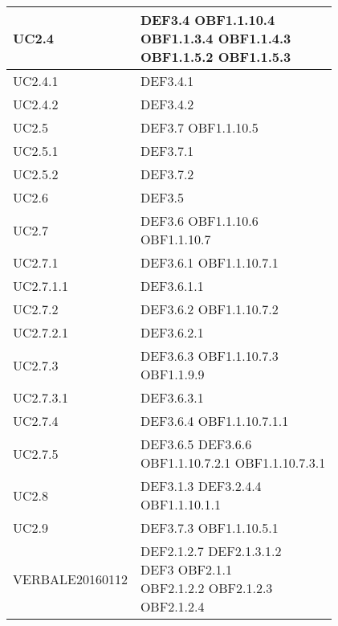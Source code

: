 \documentclass{scalatekids-article}
\begin{document}
\begin{longtable}[H]{|p{5.5cm}|p{5.5cm}|}
\hline
UC2.4 & \multiLineCell[t]{DEF3.4 OBF1.1.10.4\\OBF1.1.3.4 OBF1.1.4.3\\OBF1.1.5.2 OBF1.1.5.3\\}\\
\hline
UC2.4.1 & \multiLineCell[t]{DEF3.4.1\\}\\
\hline
UC2.4.2 & \multiLineCell[t]{DEF3.4.2\\}\\
\hline
UC2.5 & \multiLineCell[t]{DEF3.7 OBF1.1.10.5\\}\\
\hline
UC2.5.1 & \multiLineCell[t]{DEF3.7.1\\}\\
\hline
UC2.5.2 & \multiLineCell[t]{DEF3.7.2\\}\\
\hline
UC2.6 & \multiLineCell[t]{DEF3.5\\}\\
\hline
UC2.7 & \multiLineCell[t]{DEF3.6 OBF1.1.10.6\\OBF1.1.10.7\\}\\
\hline
UC2.7.1 & \multiLineCell[t]{DEF3.6.1 OBF1.1.10.7.1\\}\\
\hline
UC2.7.1.1 & \multiLineCell[t]{DEF3.6.1.1\\}\\
\hline
UC2.7.2 & \multiLineCell[t]{DEF3.6.2 OBF1.1.10.7.2\\}\\
\hline
UC2.7.2.1 & \multiLineCell[t]{DEF3.6.2.1\\}\\
\hline
UC2.7.3 & \multiLineCell[t]{DEF3.6.3 OBF1.1.10.7.3\\OBF1.1.9.9}\\
\hline
UC2.7.3.1 & \multiLineCell[t]{DEF3.6.3.1\\}\\
\hline
UC2.7.4 & \multiLineCell[t]{DEF3.6.4 OBF1.1.10.7.1.1\\}\\
\hline
UC2.7.5 & \multiLineCell[t]{DEF3.6.5 DEF3.6.6\\OBF1.1.10.7.2.1 OBF1.1.10.7.3.1\\}\\
\hline
UC2.8 & \multiLineCell[t]{DEF3.1.3 DEF3.2.4.4\\OBF1.1.10.1.1\\}\\
\hline
UC2.9 & \multiLineCell[t]{DEF3.7.3 OBF1.1.10.5.1\\}\\
\hline
VERBALE20160112 & \multiLineCell[t]{DEF2.1.2.7 DEF2.1.3.1.2\\DEF3 OBF2.1.1\\OBF2.1.2.2 OBF2.1.2.3\\OBF2.1.2.4}\\
\hline
\end{longtable}
\end{document}
